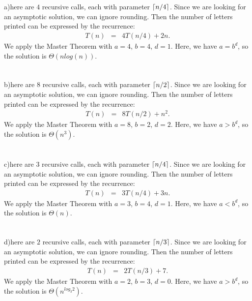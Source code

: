 \documentclass[11pt]{article}
\begin{document}
\pagebreak
\footnotesize

\begin{solution}
\\\\
	a)here are $4$ recursive calls, each with parameter ${\left\lceil n/4\right\rceil}$. Since
we are looking for an asymptotic solution, we can ignore rounding. Then
the number of letters printed can be expressed by the recurrence:
%
\begin{eqnarray*}
	T(n) &=& 4 T(n/4) + 2n.
\end{eqnarray*}
%
We apply the Master Theorem with $a = 4$, $b = 4$, $d = 1$. Here, we
have $a = b^d$, so the solution is $\Theta(nlog(n))$.\\\\\\

b)here are $8$ recursive calls, each with parameter ${\left\lceil n/2\right\rceil}$. Since
we are looking for an asymptotic solution, we can ignore rounding. Then
the number of letters printed can be expressed by the recurrence:
%
\begin{eqnarray*}
	T(n) &=& 8 T(n/2) + n^2.
\end{eqnarray*}
%
We apply the Master Theorem with $a = 8$, $b = 2$, $d = 2$. Here, we
have $a > b^d$, so the solution is $\Theta(n^3)$.\\\\\\


c)here are $3$ recursive calls, each with parameter ${\left\lceil n/4\right\rceil}$. Since
we are looking for an asymptotic solution, we can ignore rounding. Then
the number of letters printed can be expressed by the recurrence:
%
\begin{eqnarray*}
	T(n) &=& 3 T(n/4) + 3n.
\end{eqnarray*}
%
We apply the Master Theorem with $a = 3$, $b = 4$, $d = 1$. Here, we
have $a < b^d$, so the solution is $\Theta(n)$.\\\\\\


d)here are $2$ recursive calls, each with parameter ${\left\lceil n/3\right\rceil}$. Since
we are looking for an asymptotic solution, we can ignore rounding. Then
the number of letters printed can be expressed by the recurrence:
%
\begin{eqnarray*}
	T(n) &=& 2 T(n/3) + 7.
\end{eqnarray*}
%
We apply the Master Theorem with $a = 2$, $b = 3$, $d = 0$. Here, we
have $a > b^d$, so the solution is $\Theta(n^{log_{3}2})$.\\\\\\



\end{solution}
\end{document}
